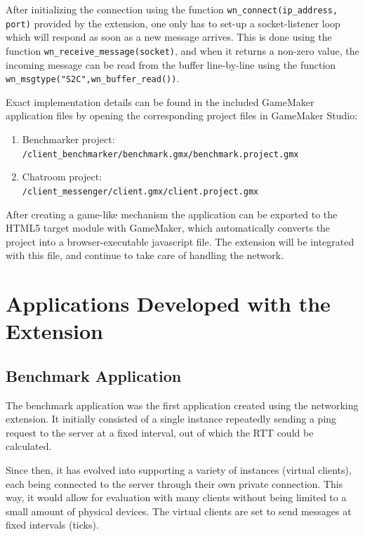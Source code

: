 \documentclass[bsc, 12pt, twoside, singlespacing, parskip, abbrevs, notimes, normalheadings, logo]{styles/infthesis}
\begin{document}
After initializing the connection using the function \texttt{wn\_connect(ip\_address, port)} provided by the extension, one only has to set-up a socket-listener loop which will respond as soon as a new message arrives. This is done using the function \texttt{wn\_receive\_message(socket)}, and when it returns a non-zero value, the incoming message can be read from the buffer line-by-line using the function \texttt{wn\_msgtype("S2C",wn\_buffer\_read())}.

Exact implementation details can be found in the included GameMaker application files by opening the corresponding project files in GameMaker Studio: 
\begin{enumerate}
\item Benchmarker project:\\ \texttt{/client\_benchmarker/benchmark.gmx/benchmark.project.gmx}
\item Chatroom project:\\ \texttt{/client\_messenger/client.gmx/client.project.gmx}
\end{enumerate}

After creating a game-like mechanism the application can be exported to the HTML5 target module with GameMaker, which automatically converts the project into a browser-executable javascript file. The extension will be integrated with this file, and continue to take care of handling the network.

\section{Applications Developed with the Extension}
\subsection{Benchmark Application}
The benchmark application was the first application created using the networking extension. It initially consisted of a single instance repeatedly sending a ping request to the server at a fixed interval, out of which the RTT could be calculated.

Since then, it has evolved into supporting a variety of instances (virtual clients), each being connected to the server through their own private connection. This way, it would allow for evaluation with many clients without being limited to a small amount of physical devices. The virtual clients are set to send messages at fixed intervals (ticks).
\end{document}

